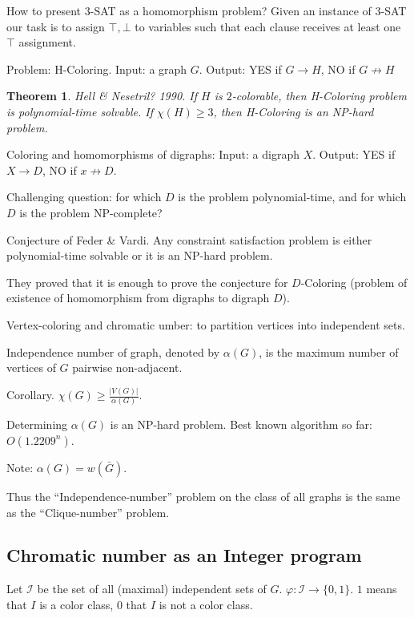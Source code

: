 \documentclass[12pt,a4paper]{article} \usepackage{fontspec}
\newtheorem{theorem}{Theorem} \newtheorem{definition}{Definition}
\begin{document}
How to present \(3\)-SAT as a homomorphism problem?  Given an instance of
\(3\)-SAT our task is to assign \(\top, \bot\) to variables such that each
clause receives at least one \(\top\) assignment.

Problem: H-Coloring.  Input: a graph \(G\).  Output: YES if \(G \to H\), NO if
\(G \not\to H\)

\begin{theorem} Hell \& Nesetril? 1990.  If \(H\) is \(2\)-colorable, then
H-Coloring problem is polynomial-time solvable.  If \(\chi(H) \geq 3\), then
H-Coloring is an NP-hard problem.  \end{theorem}

Coloring and homomorphisms of digraphs: Input: a digraph \(X\).  Output: YES if
\(X \to D\), NO if \(x \not\to D\).

Challenging question: for which \(D\) is the problem polynomial-time, and for
which \(D\) is the problem NP-complete?

Conjecture of Feder \& Vardi. Any constraint satisfaction problem is either
polynomial-time solvable or it is an NP-hard problem.

They proved that it is enough to prove the conjecture for \(D\)-Coloring
(problem of existence of homomorphism from digraphs to digraph \(D\)).

Vertex-coloring and chromatic umber: to partition vertices into independent
sets.

Independence number of graph, denoted by \(\alpha(G)\), is the maximum number of
vertices of \(G\) pairwise non-adjacent.

Corollary. \(\chi(G) \geq \frac{|V(G)|}{\alpha(G)}\).

Determining \(\alpha(G)\) is an NP-hard problem.  Best known algorithm so far:
\(O(1.2209^n)\).

Note: \(\alpha(G) = w(\bar{G})\).

Thus the \enquote{Independence-number} problem on the class of all graphs is the
same as the \enquote{Clique-number} problem.

\subsection{Chromatic number as an Integer program}

Let \(\mathcal{I}\) be the set of all (maximal) independent sets of \(G\).
\(\varphi: \mathcal{I} \to \{0, 1\}\). \(1\) means that \(I\) is a color class,
\(0\) that \(I\) is not a color class.
\end{document}
